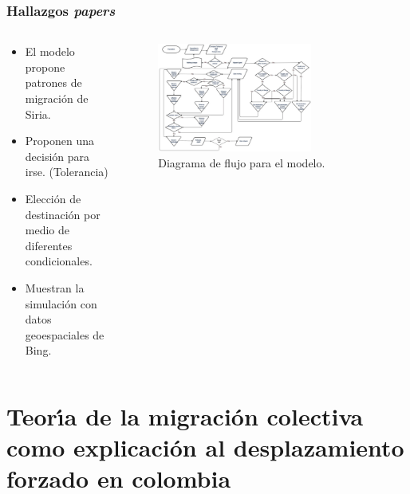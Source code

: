 \documentclass[17pt, t, lualatex]{beamer}
\begin{document}
\begin{frame}[allowframebreaks]
  \frametitle{Hallazgos \textit{papers}}
  
  \begin{columns}
    \begin{column}{.5\textwidth}
      \begin{itemize}
        \item El modelo propone patrones de migración de Siria.
        \item Proponen una decisión para irse. (Tolerancia)
        \item Elección de destinación por medio de diferentes condicionales.
        \item Muestran la simulación con datos geoespaciales de Bing.
      \end{itemize}
    \end{column}

    \begin{column}{.5\textwidth}
      \begin{figure}[ht]
        \centering
        \includegraphics[width=0.7\textwidth]{img/Paper1Fig1.png}
        \caption{\label{fig:p1f1} Diagrama de flujo para el modelo.\cite{suleimenova2020predicting}}
      \end{figure}

    \end{column}
  \end{columns}

\end{frame}

\section{Teorı́a de la migración colectiva como explicación al desplazamiento forzado en colombia}

\insertsectionpage
\end{document}
